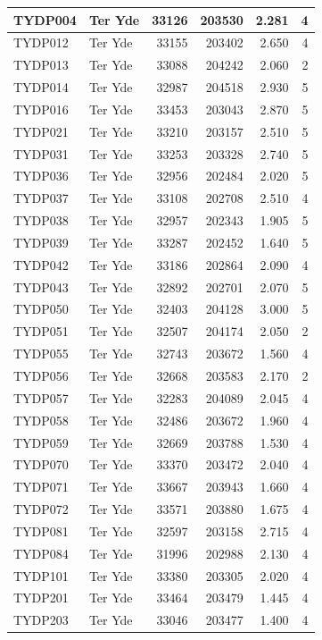 \documentclass[11pt,]{book}
\begin{document}
\begin{table}
\begin{tabular}[t]{l|l|r|r|r|r}
\hline
TYDP004 & Ter Yde & 33126 & 203530 & 2.281 & 4\\
\hline
TYDP012 & Ter Yde & 33155 & 203402 & 2.650 & 4\\
\hline
TYDP013 & Ter Yde & 33088 & 204242 & 2.060 & 2\\
\hline
TYDP014 & Ter Yde & 32987 & 204518 & 2.930 & 5\\
\hline
TYDP016 & Ter Yde & 33453 & 203043 & 2.870 & 5\\
\hline
TYDP021 & Ter Yde & 33210 & 203157 & 2.510 & 5\\
\hline
TYDP031 & Ter Yde & 33253 & 203328 & 2.740 & 5\\
\hline
TYDP036 & Ter Yde & 32956 & 202484 & 2.020 & 5\\
\hline
TYDP037 & Ter Yde & 33108 & 202708 & 2.510 & 4\\
\hline
TYDP038 & Ter Yde & 32957 & 202343 & 1.905 & 5\\
\hline
TYDP039 & Ter Yde & 33287 & 202452 & 1.640 & 5\\
\hline
TYDP042 & Ter Yde & 33186 & 202864 & 2.090 & 4\\
\hline
TYDP043 & Ter Yde & 32892 & 202701 & 2.070 & 5\\
\hline
TYDP050 & Ter Yde & 32403 & 204128 & 3.000 & 5\\
\hline
TYDP051 & Ter Yde & 32507 & 204174 & 2.050 & 2\\
\hline
TYDP055 & Ter Yde & 32743 & 203672 & 1.560 & 4\\
\hline
TYDP056 & Ter Yde & 32668 & 203583 & 2.170 & 2\\
\hline
TYDP057 & Ter Yde & 32283 & 204089 & 2.045 & 4\\
\hline
TYDP058 & Ter Yde & 32486 & 203672 & 1.960 & 4\\
\hline
TYDP059 & Ter Yde & 32669 & 203788 & 1.530 & 4\\
\hline
TYDP070 & Ter Yde & 33370 & 203472 & 2.040 & 4\\
\hline
TYDP071 & Ter Yde & 33667 & 203943 & 1.660 & 4\\
\hline
TYDP072 & Ter Yde & 33571 & 203880 & 1.675 & 4\\
\hline
TYDP081 & Ter Yde & 32597 & 203158 & 2.715 & 4\\
\hline
TYDP084 & Ter Yde & 31996 & 202988 & 2.130 & 4\\
\hline
TYDP101 & Ter Yde & 33380 & 203305 & 2.020 & 4\\
\hline
TYDP201 & Ter Yde & 33464 & 203479 & 1.445 & 4\\
\hline
TYDP203 & Ter Yde & 33046 & 203477 & 1.400 & 4\\

\end{tabular}
\end{table}
\end{document}
